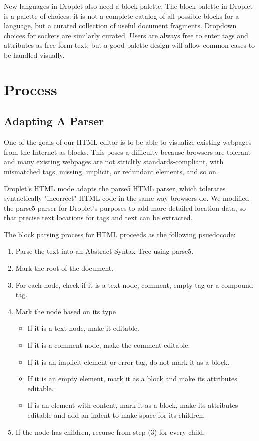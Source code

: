 \documentclass[conference]{IEEEtran}
\begin{document}
New languages in Droplet also need a block palette.  The block palette in Droplet is a palette of choices: it is not a complete catalog of all possible blocks for a language, but a curated collection of useful document fragments.  Dropdown choices for sockets are similarly curated.  Users are always free to enter tags and attributes as free-form text, but a good palette design will allow common cases to be handled visually.

\section{Process}

\subsection{Adapting A Parser}
One of the goals of our HTML editor is to be able to visualize existing webpages from the Internet as blocks. This poses a difficulty because browsers are tolerant and many existing webpages are not stricltly standards-compliant, with mismatched tags, missing, implicit, or redundant elements, and so on.

Droplet's HTML mode adapts the parse5 \cite{parse5} HTML parser, which tolerates syntactically "incorrect" HTML code in the same way browsers do. We modified the parse5 parser for Droplet's purposes to add more detailed location data, so that precise text locations for tags and text can be extracted.

The block parsing process for HTML proceeds as the following psuedocode:
\begin{enumerate}
  \item Parse the text into an Abstract Syntax Tree using parse5.
  \item Mark the root of the document.
  \item For each node, check if it is a text node, comment, empty tag or a compound tag.
  \item Mark the node based on its type
  \begin{itemize}
    \item If it is a text node, make it editable.
    \item If it is a comment node, make the comment editable.
    \item If it is an implicit element or error tag, do not mark it as a block.
    \item If it is an empty element, mark it as a block and make its attributes editable.
    \item If is an element with content, mark it as a block, make its attributes editable and add an indent to make space for its children.
  \end{itemize}
  \item If the node has children, recurse from step (3) for every child.
\end{enumerate}
\end{document}
